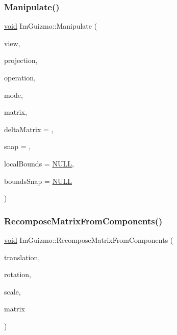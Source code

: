 \subsubsection{\texorpdfstring{Manipulate()}{Manipulate()}}
{\footnotesize\ttfamily \mbox{\hyperlink{_thread_8h_af1e856da2e658414cb2456cb6f7ebc66}{void}} Im\+Guizmo\+::\+Manipulate (\begin{DoxyParamCaption}\item[{const float $\ast$}]{view,  }\item[{const float $\ast$}]{projection,  }\item[{\mbox{\hyperlink{namespace_im_guizmo_a3559e88fd6409ce121ee4d9847867cd1}{O\+P\+E\+R\+A\+T\+I\+ON}}}]{operation,  }\item[{\mbox{\hyperlink{namespace_im_guizmo_a555eafa3970d08a1afb7b47bce89d05a}{M\+O\+DE}}}]{mode,  }\item[{float $\ast$}]{matrix,  }\item[{float $\ast$}]{delta\+Matrix = {},  }\item[{float $\ast$}]{snap = {},  }\item[{float $\ast$}]{local\+Bounds = {\ttfamily \mbox{\hyperlink{_util_8h_a070d2ce7b6bb7e5c05602aa8c308d0c4}{N\+U\+LL}}},  }\item[{float $\ast$}]{bounds\+Snap = {\ttfamily \mbox{\hyperlink{_util_8h_a070d2ce7b6bb7e5c05602aa8c308d0c4}{N\+U\+LL}}} }\end{DoxyParamCaption})}

\mbox{\label{namespace_im_guizmo_a70bc9423194e2ab58e351ea881126b17}} 
\subsubsection{\texorpdfstring{Recompose\+Matrix\+From\+Components()}{RecomposeMatrixFromComponents()}}
{\footnotesize\ttfamily \mbox{\hyperlink{_thread_8h_af1e856da2e658414cb2456cb6f7ebc66}{void}} Im\+Guizmo\+::\+Recompose\+Matrix\+From\+Components (\begin{DoxyParamCaption}\item[{const float $\ast$}]{translation,  }\item[{const float $\ast$}]{rotation,  }\item[{const float $\ast$}]{scale,  }\item[{float $\ast$}]{matrix }\end{DoxyParamCaption})}

